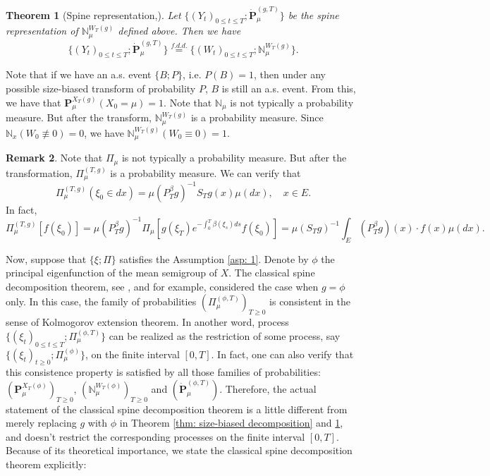 \documentclass[12pt, a4paper]{amsart}
\newtheorem{thm}{Theorem}[section]
\theoremstyle{definition}
\newtheorem{rem}[thm]{Remark}
\numberwithin{equation}{section}
\begin{document}
\begin{thm}[Spine representation,\cite{RenSongSun2017Spine}]\label{thm: spine representation}
	Let $\{(Y_t)_{0\leq t\leq T}; \dot {\mathbf P}^{(g,T)}_\mu\}$ be the spine representation of $\mathbb N^{W_T(g)}_\mu$ defined above.
	Then we have
\[
	\{(Y_t)_{0\leq t\leq T}; \dot{\mathbf P}^{(g,T)}_\mu\}
	\overset{f.d.d.}{=} \{(W_t)_{0\leq t\leq T}; \mathbb N_\mu^{W_T(g)}\}.
\]
\end{thm}

	Note that if we have an a.s. event $\{B;P\}$, i.e. $P(B) = 1$, then under any possible size-biased transform of probability $P$, $B$ is still an a.s. event. 
	From this, we have that $\mathbf P^{X_T(g)}_\mu(X_0 = \mu) = 1$.
	Note that $\mathbb N_\mu$ is not typically a probability measure. 
	But after the transform, $\mathbb N^{W_T(g)}_\mu$ is a probability measure.
	Since $\mathbb N_x(W_0 \not \equiv 0) = 0$, we have $\mathbb N_\mu^{W_T(g)}(W_0 \equiv 0) = 1$.

\begin{rem}
\label{rem: initial configuration of transformed process}
	Note that $\Pi_{\mu}$ is not typically a probability measure. 
	But after the transformation, $\Pi_{\mu}^{(T,g)}$ is a probability measure.
	We can verify that 
\[
	\Pi_{\mu}^{(T,g)} (\xi_0 \in dx) 
	= \mu(P^\beta_T g)^{-1} S_T g(x)\mu(dx),
	\quad x\in E.
\] 
	In fact, 
\[
	\Pi_{\mu}^{(T,g)} [ f(\xi_0) ] 
	= \mu(P^\beta_Tg)^{-1}\Pi_{\mu}[g(\xi_T) e^{-\int_0^T\beta(\xi_s)ds } f(\xi_0) ] 
	= \mu(S_T g)^{-1} \int_E (P^\beta_T g)(x) \cdot f(x)\mu(dx).
\]
\end{rem}

	Now, suppose that $\{\xi; \Pi\}$ satisfies the Assumption \ref{asp: 1}.
	Denote by $\phi$ the principal eigenfunction of the mean semigroup of $X$.
	The classical spine decomposition theorem, see \cite{EckhoffKyprianouWinkel2015Spines}, \cite{EnglanderKyprianou2004Local} and \cite{LiuRenSong2009Llog} for example, considered the case when $g = \phi$ only.
	In this case, the family of probabilities $(\Pi_{\mu}^{(\phi,T)})_{T\geq 0}$ is consistent in the sense of Kolmogorov extension theorem.
	In another word, process $\{(\xi_t)_{0\leq t\leq T}; \Pi_{\mu}^{(\phi,T)} \}$ can be realized as the restriction of some process, say $\{(\xi_t)_{t\geq 0}; \Pi_{\mu}^{(\phi)}\}$, on the finite interval $[0,T]$.
	In fact, one can also verify that this consistence property is satisfied by all those families of probabilities: $(\mathbf P_\mu^{X_T(\phi)} )_{T\geq 0}$, $(\mathbb N^{W_T(\phi)}_\mu)_{T\geq 0}$ and $(\dot {\mathbf P}^{(\phi,T)}_\mu)$.
	Therefore, the actual statement of the classical spine decomposition theorem is a little different from merely replacing $g$ with $\phi$ in Theorem \ref{thm: size-biased decomposition} and \ref{thm: spine representation}, and doesn't restrict the corresponding processes on the finite interval $[0,T]$.
	Because of its theoretical importance, we state the classical spine decomposition theorem explicitly:  
	
\end{document}

